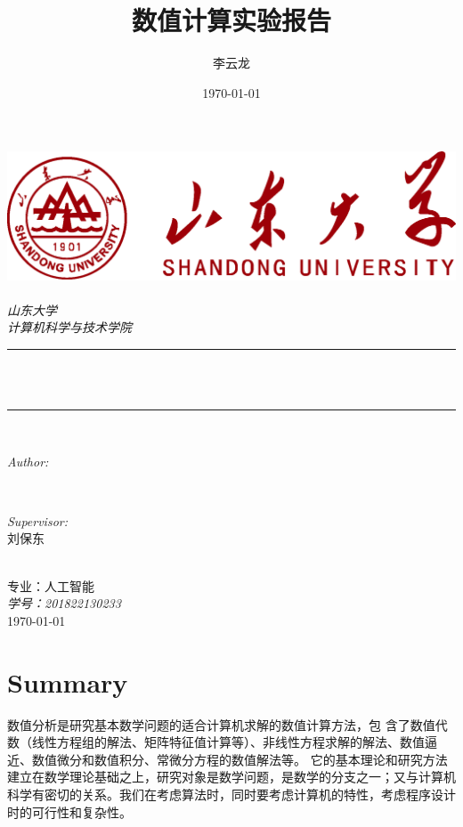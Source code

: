 \documentclass[12pt]{ctexart}
\title{数值计算实验报告}
\author{李云龙}
\date{\today}
\begin{document}
	
	\begin{titlepage}%
		\newcommand{\HRule}{\rule{\linewidth}{0.5mm}}
		\centering\includegraphics[width=17cm]{logo.png}\\[1cm] 
		\centering
		\quad\\[1.5cm]
		\textsl{\Large 山东大学 }\\[0.5cm] 
		\textsl{\large 计算机科学与技术学院}\\[0.5cm] 
		\makeatletter
		\HRule \\[0.4cm]
		{ \huge \bfseries \@title}\\[0.4cm] 
		\HRule \\[1.5cm]
		\begin{minipage}{0.4\textwidth}
			\begin{flushleft} \large
				\emph{Author:}\\
				\@author 
			\end{flushleft}
		\end{minipage}
		~
		\begin{minipage}{0.4\textwidth}
			\begin{flushright} \large
				\emph{Supervisor:} \\
				\textup{刘保东}
			\end{flushright}
		\end{minipage}\\[3cm]
		\makeatother
		{\large 专业：人工智能}\\[0.5cm]
		{\large \emph{学号：201822130233}}\\[0.5cm]
		{\large \today}\\[2cm] 
		\vfill 
	\end{titlepage}
	\newpage\tableofcontents\newpage

\newpage
	\section{Summary}
	\label{sec:0}
	数值分析是研究基本数学问题的适合计算机求解的数值计算方法，包
	含了数值代数（线性方程组的解法、矩阵特征值计算等）、非线性方程求解的解法、数值逼近、数值微分和数值积分、常微分方程的数值解法等。
	它的基本理论和研究方法建立在数学理论基础之上，研究对象是数学问题，是数学的分支之一；又与计算机科学有密切的关系。我们在考虑算法时，同时要考虑计算机的特性，考虑程序设计时的可行性和复杂性。
\newpage
\end{document}
